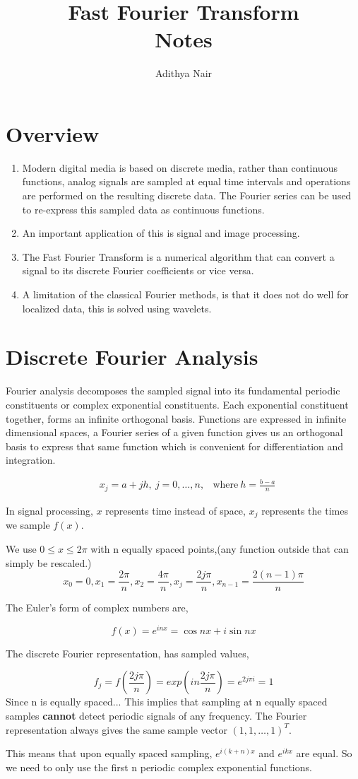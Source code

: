 \documentclass[twoside]{article}
\title{\Huge{Fast Fourier Transform}\\ Notes}
\author{\huge{Adithya Nair}}
\date{}
\begin{document}
\maketitle
\newpage%
\section{Overview}
\begin{enumerate}
	\item Modern digital media is based on discrete media, rather than continuous functions, analog signals are sampled at equal time intervals and operations are performed on the resulting discrete data. The Fourier series can be used to re-express this sampled data as continuous functions.
	\item An important application of this is signal and image processing.
	\item The Fast Fourier Transform is a numerical algorithm that can convert a signal to its discrete Fourier coefficients or vice versa.
	\item A limitation of the classical Fourier methods, is that it does not do well for localized data, this is solved using wavelets.
\end{enumerate}
\section{Discrete Fourier Analysis}
Fourier analysis decomposes the sampled signal into its fundamental periodic constituents or complex exponential constituents. Each exponential constituent together, forms an infinite orthogonal basis. Functions are expressed in infinite dimensional spaces, a Fourier series of a given function gives us an orthogonal basis to express that same function which is convenient for differentiation and integration.

\begin{align*}
	&x_j = a + jh, \ j = 0, \dots, n, & \text{where} \ h = \frac{b-a}{n}
\end{align*}

In signal processing, $x$ represents time instead of space, $x_j$ represents the times we sample $f(x)$.

We use $0 \leq x \leq 2 \pi$ with n equally spaced points,(any function outside that can simply be rescaled.)
\[ 
	x_0 = 0, x_1 = \frac{2\pi}{n}, x_2 = \frac{4\pi}{n}, x_j = \frac{2j\pi}{n}, x_{n-1} = \frac{2(n-1)\pi}{n}
\]

The Euler's form of complex numbers are,

\[
	f(x) = e^{inx} = \cos{nx} + i \sin{nx}
\]


The discrete Fourier representation, has sampled values,

\[
	f_j = f(\frac{2j \pi}{n}) = exp(in \frac{2j\pi}{n}) = e^{2j\pi i} = 1
\]
Since n is equally spaced... This implies that sampling at n equally spaced samples \textbf{cannot} detect periodic signals of any frequency. The Fourier representation always gives the same sample vector $(1,1,\dots, 1)^T$. 

This means that upon equally spaced sampling, $e^{i(k+n)x}$ and $e^{ikx}$ are equal. So we need to only use the first n periodic complex exponential functions.
\end{document}
